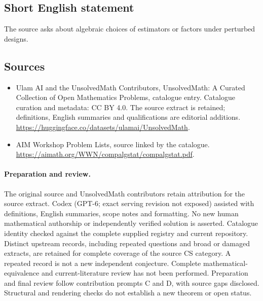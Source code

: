 \documentclass[11pt]{article}
\begin{document}
\subsection{Short English statement}
The source asks about algebraic choices of estimators or factors under perturbed designs.
\subsection{Sources}
\begin{itemize}
\item[\hypertarget{source:statement:1}{S1}] Ulam AI and the UnsolvedMath Contributors, UnsolvedMath: A Curated Collection of Open Mathematics Problems, catalogue entry. Catalogue curation and metadata: CC BY 4.0. The source extract is retained; definitions, English summaries and qualifications are editorial additions.
\url{https://huggingface.co/datasets/ulamai/UnsolvedMath}.
\item[\hypertarget{source:statement:2}{S2}] AIM Workshop Problem Lists, source linked by the catalogue.
\url{https://aimath.org/WWN/compalgstat/compalgstat.pdf}.
\end{itemize}
\paragraph{Preparation and review.}
The original source and UnsolvedMath contributors retain attribution for the source extract. Codex (GPT-6; exact serving revision not exposed) assisted with definitions, English summaries, scope notes and formatting. No new human mathematical authorship or independently verified solution is asserted. Catalogue identity checked against the complete supplied registry and current repository. Distinct upstream records, including repeated questions and broad or damaged extracts, are retained for complete coverage of the source CS category. A repeated record is not a new independent conjecture. Complete mathematical-equivalence and current-literature review has not been performed. Preparation and final review follow contribution prompts C and D, with source gaps disclosed. Structural and rendering checks do not establish a new theorem or open status.
\label{end:statement}
\end{document}
